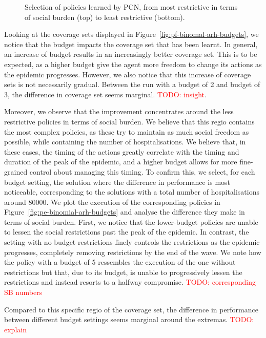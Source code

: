 \documentclass{article}
\newcommand\todo[1]{\textcolor{red}{TODO: #1}}
\begin{document}
\begin{figure}
    \centering
    
    \caption{Selection of policies learned by PCN, from most restrictive in terms of social burden (top) to least restrictive (bottom).
    }
    \label{fig:policy-execution}
\end{figure}

Looking at the coverage sets displayed in Figure~\ref{fig:pf-binomal-arh-budgets}, we notice that the budget impacts the coverage set that has been learnt. In general, an increase of budget results in an increasingly better coverage set. This is to be expected, as a higher budget give the agent more freedom to change its actions as the epidemic progresses. However, we also notice that this increase of coverage sets is not necessarily gradual. Between the run with a budget of 2 and budget of 3, the difference in coverage set seems marginal. \todo{insight}.

Moreover, we observe that the improvement concentrates around the less restrictive policies in terms of social burden. We believe that this regio contains the most complex policies, as these try to maintain as much social freedom as possible, while containing the number of hospitalisations. We believe that, in these cases, the timing of the actions greatly correlate with the timing and duration of the peak of the epidemic, and a higher budget allows for more fine-grained control about managing this timing. To confirm this, we select, for each budget setting, the solution where the difference in performance is most noticeable, corresponding to the solutions with a total number of hospitalisations around $80000$. We plot the execution of the corresponding policies in Figure~\ref{fig:pe-binomial-arh-budgets} and analyse the difference they make in terms of social burden. First, we notice that the lower-budget policies are unable to lessen the social restrictions past the peak of the epidemic. In contrast, the setting with no budget restrictions finely controls the restrictions as the epidemic progresses, completely removing restrictions by the end of the wave. We note how the policy with a budget of 5 ressembles the execution of the one without restrictions but that, due to its budget, is unable to progressively lessen the restrictions and instead resorts to a halfway compromise. \todo{corresponding SB numbers}

Compared to this specific regio of the coverage set, the difference in performance between different budget settings seems marginal around the extremas. \todo{explain}
\end{document}
